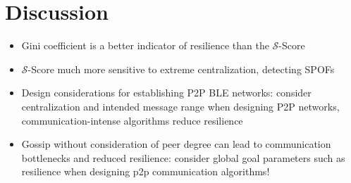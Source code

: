 \section{Discussion}
\begin{frame}
    \begin{itemize}
        \item Gini coefficient is a better indicator of resilience than the $\mathscr{S}$-Score
        \item $\mathscr{S}$-Score much more sensitive to extreme centralization, detecting SPOFs
        \item Design considerations for establishing P2P BLE networks: consider centralization and intended message range when designing P2P networks, communication-intense algorithms reduce resilience
        \item Gossip without consideration of peer degree can lead to communication bottlenecks and reduced resilience: consider global goal parameters such as resilience when designing p2p communication algorithms!
    \end{itemize}
\end{frame}